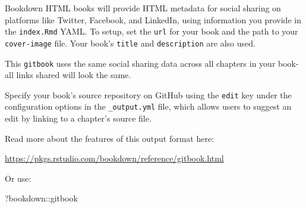 \documentclass[
]{book}
\newenvironment{Shaded}{\begin{snugshade}}{\end{snugshade}}
\newcommand{\NormalTok}[1]{#1}
\newcommand{\SpecialCharTok}[1]{\textcolor[rgb]{0.00,0.00,0.00}{#1}}
\theoremstyle{definition}
\theoremstyle{definition}
\theoremstyle{definition}
\theoremstyle{definition}
\theoremstyle{remark}
\begin{document}
Bookdown HTML books will provide HTML metadata for social sharing on platforms like Twitter, Facebook, and LinkedIn, using information you provide in the \texttt{index.Rmd} YAML. To setup, set the \texttt{url} for your book and the path to your \texttt{cover-image} file. Your book's \texttt{title} and \texttt{description} are also used.

This \texttt{gitbook} uses the same social sharing data across all chapters in your book- all links shared will look the same.

Specify your book's source repository on GitHub using the \texttt{edit} key under the configuration options in the \texttt{\_output.yml} file, which allows users to suggest an edit by linking to a chapter's source file.

Read more about the features of this output format here:

\url{https://pkgs.rstudio.com/bookdown/reference/gitbook.html}

Or use:

\begin{Shaded}
\begin{Highlighting}[]
\NormalTok{?bookdown}\SpecialCharTok{::}\NormalTok{gitbook}
\end{Highlighting}
\end{Shaded}


  
\end{document}
